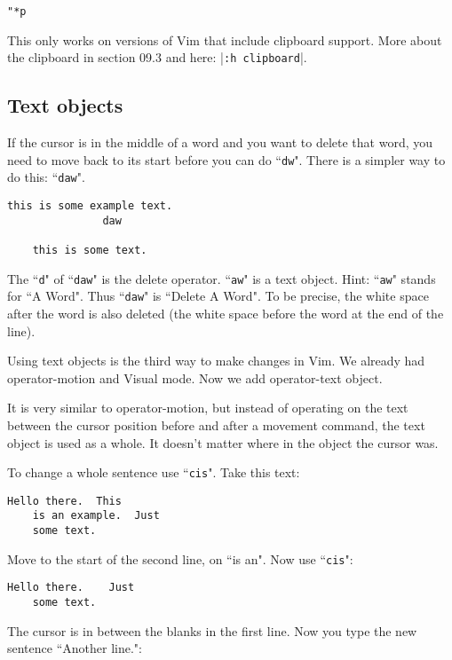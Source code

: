  \begin{Verbatim}[samepage=true]
 "*p
 \end{Verbatim}

This only works on versions of Vim that include clipboard support.
More about the clipboard in section 09.3 and here: |\texttt{:h clipboard}|.

\subsection{Text objects}

If the cursor is in the middle of a word and you want to delete that word, you need to move back to its start before you can do ``\texttt{dw}".
There is a simpler way to do this: ``\texttt{daw}".

\begin{Verbatim}[samepage=true]
    this is some example text. 
               daw

    this is some text. 
\end{Verbatim}

The ``\texttt{d}" of ``\texttt{daw}" is the delete operator.
``\texttt{aw}" is a text object.
Hint: ``\texttt{aw}" stands for ``A Word".
Thus ``\texttt{daw}" is ``Delete A Word".
To be precise, the white space after the word is also deleted (the white space before the word at the end of the line).

Using text objects is the third way to make changes in Vim.
We already had operator-motion and Visual mode.
Now we add operator-text object.

It is very similar to operator-motion, but instead of operating on the text between the cursor position before and after a movement command, the text object is used as a whole.
It doesn't matter where in the object the cursor was.

To change a whole sentence use ``\texttt{cis}".
Take this text:

\begin{Verbatim}[samepage=true]
    Hello there.  This 
    is an example.  Just 
    some text. 
\end{Verbatim}

Move to the start of the second line, on ``is an".
Now use ``\texttt{cis}":

\begin{Verbatim}[samepage=true]
    Hello there.    Just 
    some text. 
\end{Verbatim}

The cursor is in between the blanks in the first line.
Now you type the new sentence ``Another line.":

